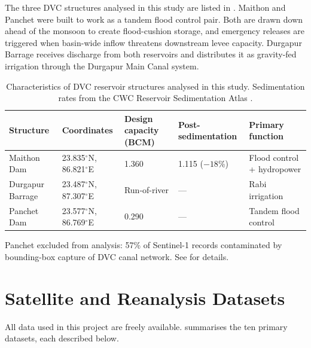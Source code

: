 \documentclass[12pt,a4paper,oneside]{report}
\begin{document}
The three DVC structures analysed in this study are listed in
. Maithon and Panchet were built to work as a
tandem flood control pair. Both are drawn down ahead of the monsoon to
create flood-cushion storage, and emergency releases are triggered when
basin-wide inflow threatens downstream levee capacity. Durgapur Barrage
receives discharge from both reservoirs and distributes it as gravity-fed
irrigation through the Durgapur Main Canal system.

\begin{table}[htbp]
  \centering
  \caption{Characteristics of DVC reservoir structures analysed in this
  study. Sedimentation rates from the CWC Reservoir Sedimentation Atlas
  \citep{CWC2022}.}
  \label{tab:thesis_reservoirs}
  \begin{tabularx}{\linewidth}{lXXXX}
    \toprule
    Structure & Coordinates & Design capacity (BCM) & Post-sedimentation & Primary function \\
    \midrule
    Maithon Dam & 23.835$^\circ$N, 86.821$^\circ$E & 1.360 & 1.115 ($-18$\%) & Flood control + hydropower \\
    Durgapur Barrage & 23.487$^\circ$N, 87.307$^\circ$E & Run-of-river & --- & Rabi irrigation \\
    Panchet Dam & 23.577$^\circ$N, 86.769$^\circ$E & 0.290 & --- & Tandem flood control \\
    \bottomrule
  \end{tabularx}

  \smallskip

  {\footnotesize Panchet excluded from analysis: 57\% of Sentinel-1 records
  contaminated by bounding-box capture of DVC canal network. See
   for details.}
\end{table}

\section{Satellite and Reanalysis Datasets}

All data used in this project are freely available. 
summarises the ten primary datasets, each described below.
\end{document}
